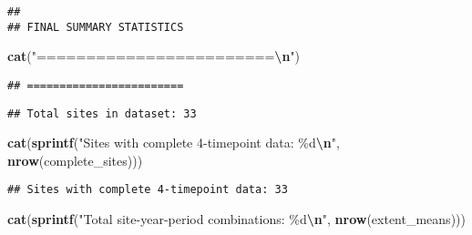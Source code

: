 \documentclass[
]{article}
\newenvironment{Shaded}{\begin{snugshade}}{\end{snugshade}}
\newcommand{\FunctionTok}[1]{\textcolor[rgb]{0.13,0.29,0.53}{\textbf{#1}}}
\newcommand{\NormalTok}[1]{#1}
\newcommand{\SpecialCharTok}[1]{\textcolor[rgb]{0.81,0.36,0.00}{\textbf{#1}}}
\newcommand{\StringTok}[1]{\textcolor[rgb]{0.31,0.60,0.02}{#1}}
\begin{document}
\begin{verbatim}
## 
## FINAL SUMMARY STATISTICS
\end{verbatim}

\begin{Shaded}
\begin{Highlighting}[]
\FunctionTok{cat}\NormalTok{(}\StringTok{"========================}\SpecialCharTok{\textbackslash{}n}\StringTok{"}\NormalTok{)}
\end{Highlighting}
\end{Shaded}

\begin{verbatim}
## ========================
\end{verbatim}

\begin{Shaded}
\end{Shaded}

\begin{verbatim}
## Total sites in dataset: 33
\end{verbatim}

\begin{Shaded}
\begin{Highlighting}[]
\FunctionTok{cat}\NormalTok{(}\FunctionTok{sprintf}\NormalTok{(}\StringTok{"Sites with complete 4{-}timepoint data: \%d}\SpecialCharTok{\textbackslash{}n}\StringTok{"}\NormalTok{, }\FunctionTok{nrow}\NormalTok{(complete\_sites)))}
\end{Highlighting}
\end{Shaded}

\begin{verbatim}
## Sites with complete 4-timepoint data: 33
\end{verbatim}

\begin{Shaded}
\begin{Highlighting}[]
\FunctionTok{cat}\NormalTok{(}\FunctionTok{sprintf}\NormalTok{(}\StringTok{"Total site{-}year{-}period combinations: \%d}\SpecialCharTok{\textbackslash{}n}\StringTok{"}\NormalTok{, }\FunctionTok{nrow}\NormalTok{(extent\_means)))}
\end{Highlighting}
\end{Shaded}
\end{document}
